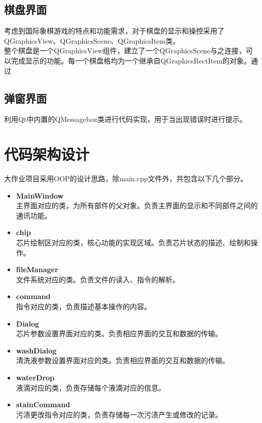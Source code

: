 \documentclass[12pt, a4paper]{article}
\begin{document}
		\subsection{棋盘界面}
		考虑到国际象棋游戏的特点和功能需求，对于棋盘的显示和操控采用了QGraphicsView、QGraphicsScene、QGraphicsItem类。	\\ \hspace*{0.8cm}		
		整个棋盘是一个QGraphicsView组件，建立了一个QGraphicsScene与之连接，可以完成显示的功能。每一个棋盘格均为一个继承自QGraphicsRectItem的对象。通过
		
	
	
		\subsection{弹窗界面}
		利用Qt中内置的QMessagebox类进行代码实现，用于当出现错误时进行提示。
		
		\section{代码架构设计}
		大作业项目采用OOP的设计思路，除main.cpp文件外，共包含以下几个部分。
		\begin{itemize}
			\item \textbf{MainWindow} \\ \hspace*{0.8cm}	主界面对应的类，为所有部件的父对象。负责主界面的显示和不同部件之间的通讯功能。
			\item \textbf{chip} \\ \hspace*{0.8cm}	芯片绘制区对应的类，核心功能的实现区域。负责芯片状态的描述、绘制和操作。
			\item \textbf{fileManager} \\ \hspace*{0.8cm}	文件系统对应的类。负责文件的读入、指令的解析。
			\item \textbf{command} \\ \hspace*{0.8cm}	指令对应的类，负责描述基本操作的内容。
			\item \textbf{Dialog} \\ \hspace*{0.8cm}	芯片参数设置界面对应的类。负责相应界面的交互和数据的传输。
			\item \textbf{\large washDialog} \\ \hspace*{0.8cm}	清洗液参数设置界面对应的类。负责相应界面的交互和数据的传输。
			\item \textbf{\large waterDrop} \\ \hspace*{0.8cm}	液滴对应的类，负责存储每个液滴对应的信息。
			\item \textbf{\large stainCommand} \\ \hspace*{0.8cm}	污渍更改指令对应的类，负责存储每一次污渍产生或修改的记录。
		\end{itemize}
		
\end{document}
